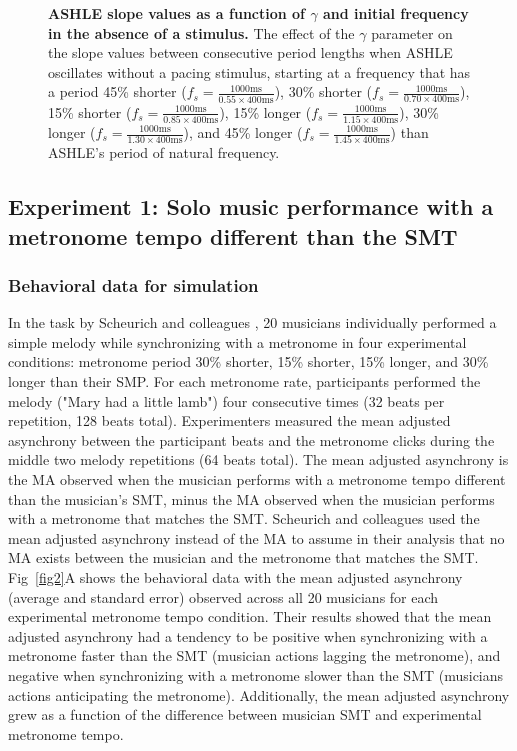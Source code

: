 \documentclass[10pt,letterpaper]{article}
\begin{document}
\begin{figure}[!h]
\caption{{\bf ASHLE slope values as a function of $\gamma$ and initial frequency in the absence of a stimulus.} The effect of the $\gamma$ parameter on the slope values between consecutive period lengths when ASHLE oscillates without a pacing stimulus, starting at a frequency that has a period 45\% shorter ($f_s = \frac{1000\text{ms}}{0.55 \times 400\text{ms}}$), 30\% shorter ($f_s = \frac{1000\text{ms}}{0.70 \times 400\text{ms}}$), 15\% shorter ($f_s = \frac{1000\text{ms}}{0.85 \times 400\text{ms}}$), 15\% longer ($f_s = \frac{1000\text{ms}}{1.15 \times 400\text{ms}}$), 30\% longer ($f_s = \frac{1000\text{ms}}{1.30 \times 400\text{ms}}$), and 45\% longer ($f_s = \frac{1000\text{ms}}{1.45 \times 400\text{ms}}$) than ASHLE's period of natural frequency.}
\label{fig8}
\end{figure}

\subsection*{Experiment 1: Solo music performance with a metronome tempo different than the SMT}

\subsubsection*{Behavioral data for simulation}

In the task by Scheurich and colleagues \cite{scheurich2018tapping}, 20 musicians individually performed a simple melody while synchronizing with a metronome in four experimental conditions: metronome period 30\% shorter, 15\% shorter, 15\% longer, and 30\% longer than their SMP. For each metronome rate, participants performed the melody ("Mary had a little lamb") four consecutive times (32 beats per repetition, 128 beats total). Experimenters measured the mean adjusted asynchrony between the participant beats and the metronome clicks during the middle two melody repetitions (64 beats total). The mean adjusted asynchrony is the MA observed when the musician performs with a metronome tempo different than the musician's SMT, minus the MA observed when the musician performs with a metronome that matches the SMT. Scheurich and colleagues \cite{scheurich2018tapping} used the mean adjusted asynchrony instead of the MA to assume in their analysis that no MA exists between the musician and the metronome that matches the SMT. Fig~\ref{fig2}A shows the behavioral data with the mean adjusted asynchrony (average and standard error) observed across all 20 musicians for each experimental metronome tempo condition. Their results showed that the mean adjusted asynchrony had a tendency to be positive when synchronizing with a metronome faster than the SMT (musician actions lagging the metronome), and negative when synchronizing with a metronome slower than the SMT (musicians actions anticipating the metronome). Additionally, the mean adjusted asynchrony grew as a function of the difference between musician SMT and experimental metronome tempo.
\end{document}
